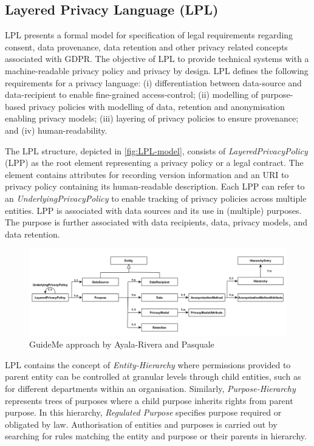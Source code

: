 \subsection*{Layered Privacy Language (LPL)}
LPL \cite{gerl_lpl_2018} presents a formal model for specification of legal requirements regarding consent, data provenance, data retention and other privacy related concepts associated with GDPR.
The objective of LPL to provide technical systems with a machine-readable privacy policy and privacy by design. 
LPL defines the following requirements for a privacy language: (i) differentiation between data-source and data-recipient to enable fine-grained access-control; (ii) modelling of purpose-based privacy policies with modelling of data, retention and anonymisation enabling privacy models; (iii) layering of privacy policies to ensure provenance; and (iv) human-readability.

The LPL structure, depicted in \autoref{fig:LPL-model}, consists of \textit{LayeredPrivacyPolicy} (LPP) as the root element representing a privacy policy or a legal contract. The element contains attributes for recording version information and an URI to privacy policy containing its human-readable description. Each LPP can refer to an \textit{UnderlyingPrivacyPolicy} to enable tracking of privacy policies across multiple entities.
LPP is associated with data sources and its use in (multiple) purposes. The purpose is further associated with data recipients, data, privacy models, and data retention.
\begin{figure}[htbp]
    \centering
    \includegraphics[width=\linewidth]{img/LPL_model.png}
    \caption{GuideMe approach by Ayala-Rivera and Pasquale \cite{gerl_lpl_2018}}
    \label{fig:LPL-model}
\end{figure}

LPL contains the concept of \textit{Entity-Hierarchy} where permissions provided to parent entity can be controlled at granular levels through child entities, such as for different departments within an organisation. Similarly, \textit{Purpose-Hierarchy} represents trees of purposes where a child purpose inherits rights from parent purpose. In this hierarchy, \textit{Regulated Purpose} specifies purpose required or obligated by law.
Authorisation of entities and purposes is carried out by searching for rules matching the entity and purpose or their parents in hierarchy. 


